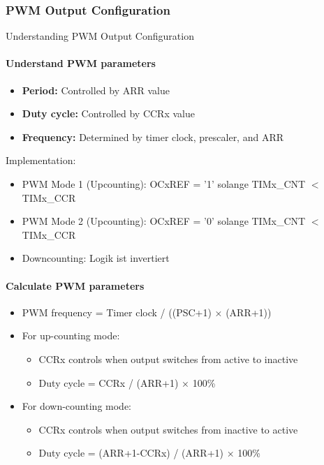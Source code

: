 \subsubsection{PWM Output Configuration}

\begin{concept}{Understanding PWM Output Configuration}
\paragraph{Understand PWM parameters}
\begin{itemize}
    \item \textbf{Period:} Controlled by ARR value
    \item \textbf{Duty cycle:} Controlled by CCRx value
    \item \textbf{Frequency:} Determined by timer clock, prescaler, and ARR
\end{itemize}
Implementation:
\begin{itemize}
        \item PWM Mode 1 (Upcounting): OCxREF = '1' solange TIMx\_CNT $<$ TIMx\_CCR
        \item PWM Mode 2 (Upcounting): OCxREF = '0' solange TIMx\_CNT $<$ TIMx\_CCR
        \item Downcounting: Logik ist invertiert
    \end{itemize}

\paragraph{Calculate PWM parameters}
\begin{itemize}
    \item PWM frequency = Timer clock / ((PSC+1) × (ARR+1))
    \item For up-counting mode:
    \begin{itemize}
        \item CCRx controls when output switches from active to inactive
        \item Duty cycle = CCRx / (ARR+1) × 100\%
    \end{itemize}
    \item For down-counting mode:
    \begin{itemize}
        \item CCRx controls when output switches from inactive to active
        \item Duty cycle = (ARR+1-CCRx) / (ARR+1) × 100\%
    \end{itemize}
\end{itemize}


\end{concept}
